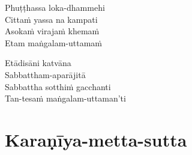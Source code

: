 \begin{paritta}
Phuṭṭhassa loka-dhammehi\\
Cittaṁ yassa na kampati\\
Asokaṁ virajaṁ khemaṁ\\
Etam maṅgalam-uttamaṁ

Etādisāni katvāna\\
Sabbattham-aparājitā\\
Sabbattha sotthiṁ gacchanti\\
Tan-tesaṁ maṅgalam-uttaman'ti


\end{paritta}

\clearpage

\chapter{Karaṇīya-metta-sutta}


